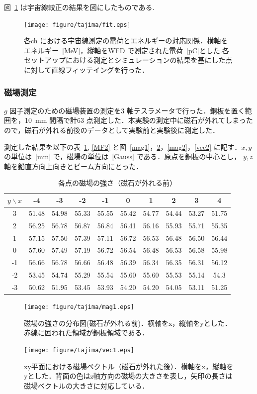 図~\ref{cali} は宇宙線較正の結果を図にしたものである.
\begin{figure}[H]
\centering
\texttt{[image: figure/tajima/fit.eps]}
\caption{各ch における宇宙線測定の電荷とエネルギーの対応関係．横軸をエネルギー~[MeV]，縦軸をWFD で測定された電荷~[pC]とした.各セットアップにおける測定とシミュレーションの結果を基にした点に対して直線フィッテイングを行った．}\label{cali}
\end{figure}

\newpage

\subsubsection{磁場測定}
$g$ 因子測定のための磁場装置の測定を3 軸テスラメータで行った．銅板を置く範囲を，10~mm 間隔で計63 点測定した．本実験の測定中に磁石が外れてしまったので，磁石が外れる前後のデータとして実験前と実験後に測定した．

測定した結果を以下の表~\ref{MF1}, \ref{MF2} と図~\ref{mag1}，\ref{vec1}，\ref{mag2}，\ref{vec2} に記す．$x, y$の単位は~[mm] で，磁場の単位は~[Gauss] である．原点を銅板の中心とし， $y, z$軸を鉛直方向上向きとビーム方向にとった．
\begin{table}[H]
\centering
\caption{各点の磁場の強さ（磁石が外れる前）}\label{MF1}
\begin{tabular}{|c||c|c|c|c|c|c|c|c|c|}\hline
$y \backslash x$ & -4 & -3 & -2 & -1 & 0 & 1 & 2 & 3 & 4 \\ \hline \hline
3 & 51.48 & 54.98 & 55.33 & 55.55 & 55.42 & 54.77 & 54.44 & 53.27 & 51.75 \\ \hline
2 & 56.25 & 56.78 & 56.87 & 56.84 & 56.41 & 56.16 & 55.93 & 55.71 & 55.35 \\ \hline
1 & 57.15 & 57.50 & 57.39 & 57.11 & 56.72 & 56.53 & 56.48 & 56.50 & 56.44 \\ \hline
0 & 57.60 & 57.49 & 57.19 & 56.72 & 56.54 & 56.48 & 56.53 & 56.58 & 55.98 \\ \hline
-1 & 56.66 & 56.78 & 56.66 & 56.48 & 56.39 & 56.34 & 56.35 & 56.31 & 56.12 \\ \hline
-2 & 53.45 & 54.74 & 55.29 & 55.54 & 55.60 & 55.60 & 55.53 & 55.14 & 54.3 \\ \hline
-3 & 50.62 & 51.95 & 53.45 & 53.93 & 54.20 & 54.20 & 54.05 & 53.11 & 51.25 \\ \hline
\end{tabular}
\end{table}
\begin{figure}[H]
\begin{minipage}{0.45\hsize}
\centering
\texttt{[image: figure/tajima/mag1.eps]}
\caption{磁場の強さの分布図(磁石が外れる前)．横軸をx，縦軸をyとした．赤線に囲われた領域が銅板領域である．}
\label{mag1}
\end{minipage}
\begin{minipage}{0.45\hsize}
\centering
\texttt{[image: figure/tajima/vec1.eps]}
\caption{xy平面における磁場ベクトル（磁石が外れた後）．横軸をx，縦軸をyとした．背面の色はz軸方向の磁場の大きさを表し，矢印の長さは磁場ベクトルの大きさに対応している．}
\label{vec1}
\end{minipage}
\end{figure}



